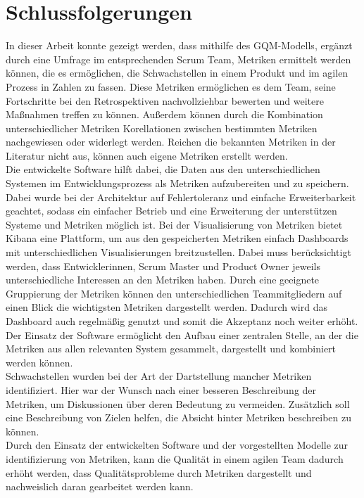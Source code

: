 \chapter{Schlussfolgerungen}

In dieser Arbeit konnte gezeigt werden, dass mithilfe des \ac{GQM}-Modells, ergänzt durch eine Umfrage im entsprechenden Scrum Team, Metriken ermittelt werden können, die es ermöglichen, die Schwachstellen in einem Produkt und im agilen Prozess in Zahlen zu fassen.
Diese Metriken ermöglichen es dem Team, seine Fortschritte bei den Retrospektiven nachvollziehbar bewerten und weitere Maßnahmen treffen zu können.
Außerdem können durch die Kombination unterschiedlicher Metriken Korellationen zwischen bestimmten Metriken nachgewiesen oder widerlegt werden.
Reichen die bekannten Metriken in der Literatur nicht aus, können auch eigene Metriken erstellt werden.
\\
Die entwickelte Software hilft dabei, die Daten aus den unterschiedlichen Systemen im Entwicklungsprozess als Metriken aufzubereiten und zu speichern.
Dabei wurde bei der Architektur auf Fehlertoleranz und einfache Erweiterbarkeit geachtet, sodass ein einfacher Betrieb und eine Erweiterung der unterstützen Systeme und Metriken möglich ist.
Bei der Visualisierung von Metriken bietet Kibana eine Plattform, um aus den gespeicherten Metriken einfach Dashboards mit unterschiedlichen Visualisierungen breitzustellen.
Dabei muss berücksichtigt werden, dass Entwicklerinnen, Scrum Master und Product Owner jeweils unterschiedliche Interessen an den Metriken haben.
Durch eine geeignete Gruppierung der Metriken können den unterschiedlichen Teammitgliedern auf einen Blick die wichtigsten Metriken dargestellt werden.
Dadurch wird das Dashboard auch regelmäßig genutzt und somit die Akzeptanz noch weiter erhöht.
Der Einsatz der Software ermöglicht den Aufbau einer zentralen Stelle, an der die Metriken aus allen relevanten System gesammelt, dargestellt und kombiniert werden können.
\\
Schwachstellen wurden bei der Art der Dartstellung mancher Metriken identifiziert.
Hier war der Wunsch nach einer besseren Beschreibung der Metriken, um Diskussionen über deren Bedeutung zu vermeiden.
Zusätzlich soll eine Beschreibung von Zielen helfen, die Absicht hinter Metriken beschreiben zu können.
\\
Durch den Einsatz der entwickelten Software und der vorgestellten Modelle zur identifizierung von Metriken, kann die Qualität in einem agilen Team dadurch erhöht werden, dass Qualitätsprobleme durch Metriken dargestellt und nachweislich daran gearbeitet werden kann.
